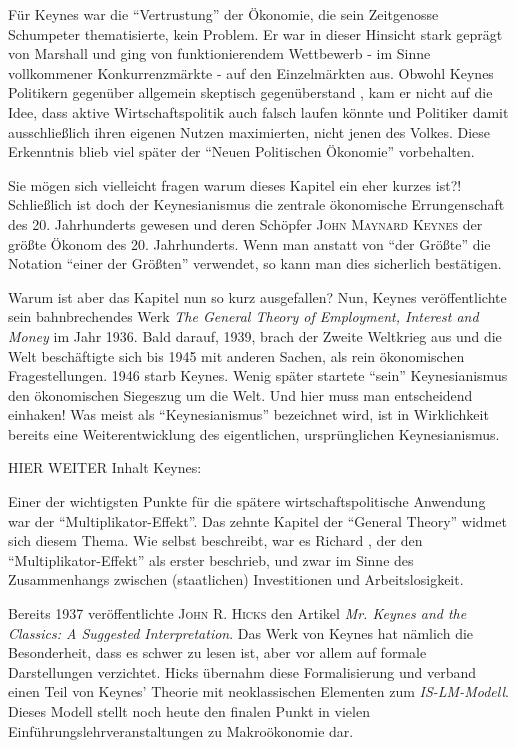 Für Keynes war die "`Vertrustung"' der Ökonomie, die sein Zeitgenosse Schumpeter thematisierte, kein Problem. Er war in dieser Hinsicht stark geprägt von Marshall und ging von funktionierendem Wettbewerb - im Sinne vollkommener Konkurrenzmärkte - auf den Einzelmärkten aus. 
Obwohl Keynes Politikern gegenüber allgemein skeptisch gegenüberstand \parencite[S. 291]{Scherf1989}, kam er nicht auf die Idee, dass aktive Wirtschaftspolitik auch falsch laufen könnte und Politiker damit ausschließlich ihren eigenen Nutzen maximierten, nicht jenen des Volkes. Diese Erkenntnis blieb viel später der "`Neuen Politischen Ökonomie"' vorbehalten. 




Sie mögen sich vielleicht fragen warum dieses Kapitel ein eher kurzes ist?! Schließlich ist doch der Keynesianismus die zentrale ökonomische Errungenschaft des 20. Jahrhunderts gewesen und deren Schöpfer \textsc{John Maynard Keynes} der größte Ökonom des 20. Jahrhunderts. Wenn man anstatt von "`der Größte"' die Notation "`einer der Größten"' verwendet, so kann man dies sicherlich bestätigen.

Warum ist aber das Kapitel nun so kurz ausgefallen? Nun, Keynes veröffentlichte sein bahnbrechendes Werk \textit{The General Theory of Employment, Interest and Money} im Jahr 1936. Bald darauf, 1939, brach der Zweite Weltkrieg aus und die Welt beschäftigte sich bis 1945 mit anderen Sachen, als rein ökonomischen Fragestellungen. 1946 starb Keynes. Wenig später startete "`sein"' Keynesianismus den ökonomischen Siegeszug um die Welt. Und hier muss man entscheidend einhaken! Was meist als "`Keynesianismus"' bezeichnet wird, ist in Wirklichkeit bereits eine Weiterentwicklung des eigentlichen, ursprünglichen Keynesianismus.

HIER WEITER
Inhalt Keynes:

Einer der wichtigsten Punkte für die spätere wirtschaftspolitische Anwendung war der "`Multiplikator-Effekt"'. Das zehnte Kapitel der "`General Theory"' widmet sich diesem Thema. Wie \textcite[S. 114]{Keynes1936} selbst beschreibt, war es Richard \textcite{Kahn1931}, der den "`Multiplikator-Effekt"' als erster beschrieb, und zwar im Sinne des Zusammenhangs zwischen (staatlichen) Investitionen und Arbeitslosigkeit.






Bereits 1937 veröffentlichte \textsc{John R. Hicks} den Artikel \textit{Mr. Keynes and the Classics: A Suggested Interpretation}. Das Werk von Keynes hat nämlich die Besonderheit, dass es schwer zu lesen ist, aber vor allem auf formale Darstellungen verzichtet. Hicks übernahm diese Formalisierung und verband einen Teil von Keynes' Theorie mit neoklassischen Elementen zum \textit{IS-LM-Modell}. Dieses Modell stellt noch heute den finalen Punkt in vielen Einführungslehrveranstaltungen zu Makroökonomie dar.

